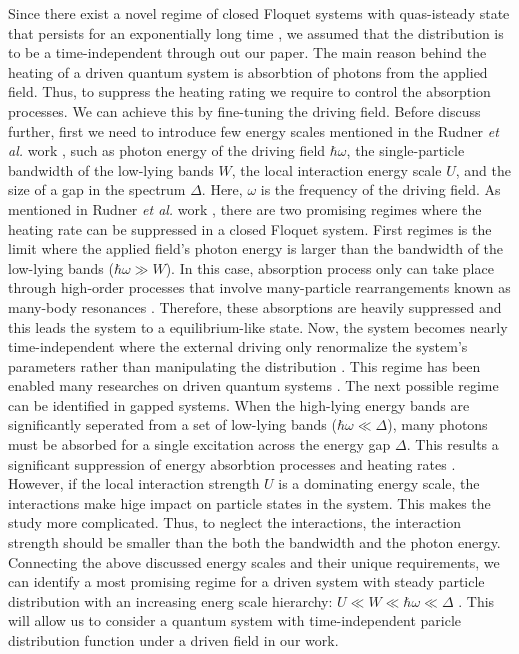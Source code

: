 \documentclass{article}
\begin{document}
Since there exist a novel regime of closed Floquet systems with quas-isteady state that persists for an exponentially long time \cite{lindner2017}, we assumed that the distribution is to be a time-independent through out our paper. The main reason behind the heating of a driven quantum system is absorbtion of photons from the applied field. Thus, to suppress the heating rating we require to control the absorption processes. We can achieve this by fine-tuning the driving field. Before discuss further, first we need to introduce few energy scales mentioned in the Rudner \textit{et al.} work \cite{rudner2020}, such as photon energy of the driving field $\hbar\omega$, the single-particle bandwidth of the low-lying bands $W$, the local interaction energy scale $U$, and the size of a gap in the spectrum $\Delta$.  Here, $\omega$ is the frequency of the driving field.
As mentioned in Rudner \textit{et al.} work \cite{rudner2020}, there are two promising regimes where the heating rate can be suppressed in a closed Floquet system. First regimes is the limit where the applied field's photon energy is larger than the bandwidth of the low-lying bands ($\hbar\omega \gg W$). In this case, absorption process only can take place through high-order processes that involve many-particle rearrangements known as many-body resonances \cite{bukov2016,lindner2017,rudner2020}. Therefore, these absorptions are heavily suppressed and this leads the system to a equilibrium-like
state. Now, the system becomes nearly time-independent where the external driving only renormalize the system's parameters rather than manipulating the distribution \cite{wackerlthesis20}.
This regime has been enabled many researches on driven quantum systems \cite{kitagawa2011,lopez2015,pervishko2015,bukov2015,yudin2016}.
The next possible regime can be identified in gapped systems. When the high-lying energy bands are significantly seperated from a set of low-lying bands ($\hbar\omega \ll \Delta$), many photons must be absorbed for a single excitation across the energy gap $\Delta$. This results a significant suppression of energy absorbtion processes and heating rates \cite{rudner2020}. However, if the local interaction strength $U$ is a dominating energy scale, the interactions make hige impact on particle states in the system. This makes the study more complicated. Thus, to neglect the interactions, the interaction strength should be smaller than the both the bandwidth and the photon energy. Connecting the above discussed energy scales and their unique requirements, we can identify a most promising regime for a driven system with steady particle distribution with an increasing energ scale hierarchy: $U \ll W \ll \hbar\omega \ll \Delta$ \cite{wackerlthesis20}. This will allow us to consider a quantum system with time-independent paricle distribution function under a driven field in our work.
\end{document}
